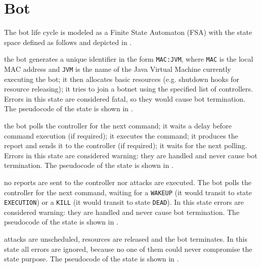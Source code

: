 \section{Bot}
\label{sec:bot}

The bot life cycle is modeled as a Finite State Automaton (FSA) with the state space defined as follows and depicted in .

\begin{description}
  \setlength\itemsep{1em}

  \item[INIT] the bot generates a unique identifier in the form \texttt{MAC:JVM}, where \texttt{MAC} is the local MAC address and \texttt{JVM} is the name of the Java Virtual Machine currently executing the bot; it then allocates basic resources (e.g. shutdown hooks for resource releasing); it tries to join a botnet using the specified list of controllers.
  Errors in this state are considered fatal, so they would cause bot termination. The pseudocode of the state is shown in .

  \item[EXECUTION] the bot polls the controller for the next command; it waits a delay before command execution (if required); it executes the command; it produces the report and sends it to the controller (if required); it waits for the next polling.
  Errors in this state are considered warning: they are handled and never cause bot termination. The pseudocode of the state is shown in .

  \item[SLEEP] no reports are sent to the controller nor attacks are executed. The bot polls the controller for the next command, waiting for a \texttt{WAKEUP} (it would transit to state \texttt{EXECUTION}) or a \texttt{KILL} (it would transit to state \texttt{DEAD}).
  In this state errors are considered warning: they are handled and never cause bot termination. The pseudocode of the state is shown in .

  \item[DEAD] attacks are unscheduled, resources are released and the bot terminates. In this state all errors are ignored, because no one of them could never compromise the state purpose. The pseudocode of the state is shown in .

\end{description}

